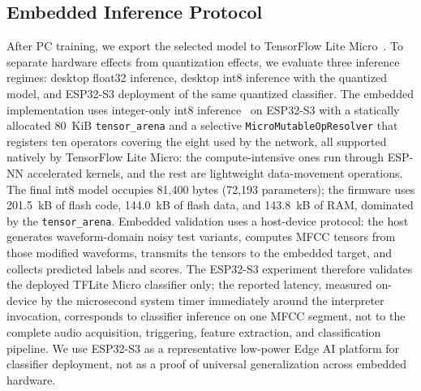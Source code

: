 ﻿\documentclass[conference]{IEEEtran}
\begin{document}
\subsection{Embedded Inference Protocol}
After PC training, we export the selected model to TensorFlow Lite Micro~\cite{tflite,david2021tflm}. To separate hardware effects from quantization effects, we evaluate three inference regimes: desktop float32 inference, desktop int8 inference with the quantized model, and ESP32-S3 deployment of the same quantized classifier. The embedded implementation uses integer-only int8 inference~\cite{jacob2018quantization} on ESP32-S3 with a statically allocated 80~KiB \texttt{tensor\_arena} and a selective \texttt{MicroMutableOpResolver} that registers ten operators covering the eight used by the network, all supported natively by TensorFlow Lite Micro: the compute-intensive ones run through ESP-NN accelerated kernels, and the rest are lightweight data-movement operations. The final int8 model occupies 81,400 bytes (72,193 parameters); the firmware uses 201.5~kB of flash code, 144.0~kB of flash data, and 143.8~kB of RAM, dominated by the \texttt{tensor\_arena}. Embedded validation uses a host-device protocol: the host generates waveform-domain noisy test variants, computes MFCC tensors from those modified waveforms, transmits the tensors to the embedded target, and collects predicted labels and scores. The ESP32-S3 experiment therefore validates the deployed TFLite Micro classifier only; the reported latency, measured on-device by the microsecond system timer immediately around the interpreter invocation, corresponds to classifier inference on one MFCC segment, not to the complete audio acquisition, triggering, feature extraction, and classification pipeline. We use ESP32-S3 as a representative low-power Edge AI platform for classifier deployment, not as a proof of universal generalization across embedded hardware.
\end{document}
